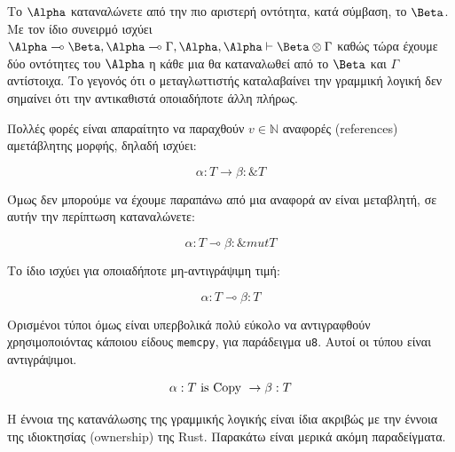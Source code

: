 Το $\Alpha$ καταναλώνετε από την πιο αριστερή οντότητα, κατά σύμβαση, το $\Beta$.
Με τον ίδιο συνειρμό ισχύει  $\Alpha \multimap \Beta,\Alpha \multimap \Gamma, \Alpha,\Alpha \vdash \Beta \otimes \Gamma$
καθώς τώρα έχουμε δύο οντότητες του $\Alpha$ η κάθε μια θα καταναλωθεί από το $\Beta$ και $\Gamma$ αντίστοιχα. Το γεγονός
ότι ο μεταγλωττιστής καταλαβαίνει την γραμμική λογική δεν σημαίνει ότι την αντικαθιστά οποιαδήποτε άλλη πλήρως.

Πολλές φορές είναι απαραίτητο να παραχθούν $v\in\mathbb{N} $ αναφορές (references) αμετάβλητης μορφής, δηλαδή ισχύει:

\begin{equation}
\alpha:T \rightarrow \beta: \&T
\end{equation}

Όμως δεν μπορούμε να έχουμε παραπάνω από μια αναφορά αν είναι μεταβλητή, σε αυτήν την περίπτωση καταναλώνετε:

\begin{equation}
\alpha:T \multimap \beta: \& mut T
\end{equation}

Το ίδιο ισχύει για οποιαδήποτε μη-αντιγράψιμη τιμή:

\begin{equation}
\alpha:T \multimap \beta: T
\end{equation}

Ορισμένοι τύποι όμως είναι υπερβολικά πολύ εύκολο να αντιγραφθούν χρησιμοποιόντας κάποιου είδους
\verb|memcpy|, για παράδειγμα \verb|u8|. Αυτοί οι τύπου είναι αντιγράψιμοι.

\begin{equation}
\alpha:T \textup{ is Copy } \rightarrow \beta:T
\end{equation}

Η έννοια της κατανάλωσης της γραμμικής λογικής είναι ίδια ακριβώς με την έννοια
της ιδιοκτησίας (ownership) της Rust. Παρακάτω είναι μερικά ακόμη παραδείγματα.

